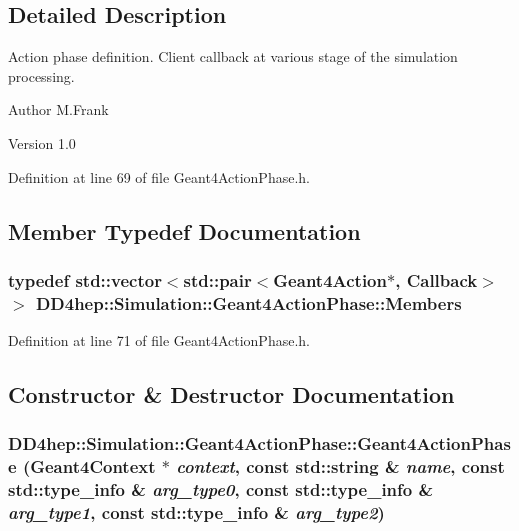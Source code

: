 \subsection{Detailed Description}
Action phase definition. Client callback at various stage of the simulation processing. \begin{DoxyAuthor}{Author}
M.Frank 
\end{DoxyAuthor}
\begin{DoxyVersion}{Version}
1.0 
\end{DoxyVersion}


Definition at line 69 of file Geant4ActionPhase.h.

\subsection{Member Typedef Documentation}
\hypertarget{class_d_d4hep_1_1_simulation_1_1_geant4_action_phase_a4df9a501a5c2d810603cd58f5ff5157d}{
\subsubsection[{Members}]{\setlength{\rightskip}{0pt plus 5cm}typedef std::vector$<$std::pair$<${\bf Geant4Action}$\ast$, {\bf Callback}$>$ $>$ {\bf DD4hep::Simulation::Geant4ActionPhase::Members}}}
\label{class_d_d4hep_1_1_simulation_1_1_geant4_action_phase_a4df9a501a5c2d810603cd58f5ff5157d}


Definition at line 71 of file Geant4ActionPhase.h.

\subsection{Constructor \& Destructor Documentation}
\hypertarget{class_d_d4hep_1_1_simulation_1_1_geant4_action_phase_a8ede43df709ab0035560db446aa2f8ad}{
\subsubsection[{Geant4ActionPhase}]{\setlength{\rightskip}{0pt plus 5cm}DD4hep::Simulation::Geant4ActionPhase::Geant4ActionPhase ({\bf Geant4Context} $\ast$ {\em context}, \/  const std::string \& {\em name}, \/  const std::type\_\-info \& {\em arg\_\-type0}, \/  const std::type\_\-info \& {\em arg\_\-type1}, \/  const std::type\_\-info \& {\em arg\_\-type2})}}
\label{class_d_d4hep_1_1_simulation_1_1_geant4_action_phase_a8ede43df709ab0035560db446aa2f8ad}


